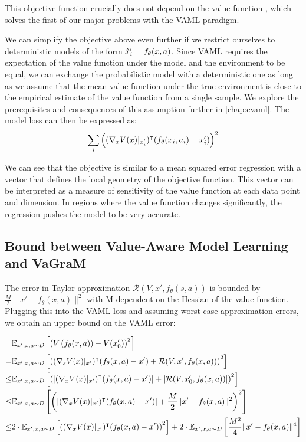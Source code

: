This objective function crucially does not depend on the value function , which solves the first of our major problems with the VAML paradigm.

We can simplify the objective above even further if we restrict ourselves to deterministic models of the form $\hat{x}'_i = f_\theta(x,a)$.
Since VAML requires the expectation of the value function under the model and the environment to be equal, we can exchange the probabilistic model with a deterministic one as long as we assume that the mean value function under the true environment is close to the empirical estimate of the value function from a single sample.
We explore the prerequisites and consequences of this assumption further in \autoref{chap:cvaml}.
The model loss can then be expressed as:
\begin{align}
    \sum_i {\left((\nabla_x V(x)|_{x'_i})^\intercal (f_\theta(x_i,a_i) - x'_i) \right)^2} \label{eq:vagram:taylor_vaml}
\end{align}

We can see that the objective is similar to a mean squared error regression with a vector that defines the local geometry of the objective function. This vector can be interpreted as a measure of sensitivity of the value function at each data point and dimension. In regions where the value function changes significantly, the regression pushes the model to be very accurate. 

\subsection{Bound between Value-Aware Model Learning and VaGraM}
\label{app:taylor_bound}

The error in Taylor approximation $\mathcal{R}(V, x', f_\theta(s,a))$ is bounded by $\frac{M}{2}\|x' - f_\theta(x,a)\|^2$ with M dependent on the Hessian of the value function. Plugging this into the VAML loss and assuming worst case approximation errors, we obtain an upper bound on the VAML error:

\begin{align}
    &\mathbb{E}_{x',x,a \sim D}\left[\left(V\left(f_\theta(x,a) \right) - V(x_0')\right)^2\right] \\
    = &\mathbb{E}_{x',x,a \sim D}\left[\left((\nabla_s V(x)|_{x'})^\intercal (f_\theta(x,a) - x') + \mathcal{R}(V, x',f_\theta(x,a))\right)^2\right]\\
    \leq &\mathbb{E}_{x',x,a \sim D}\left[\left(\left|(\nabla_x V(x)|_{x'})^\intercal (f_\theta(x,a) - x')\right| + \left|\mathcal{R}(V, x_0', f_\theta(x,a))\right|\right)^2\right]\\
    \leq &\mathbb{E}_{x',x,a \sim D}\left[{\left(\left|(\nabla_x V(x)|_{x'})^\intercal (f_\theta(x,a) - x')\right| + \frac{M}{2}\|x' - f_\theta(x,a)\|^2\right)^2}\right]\\
    \leq &2\cdot\mathbb{E}_{x',x,a \sim D}\left[{\left((\nabla_x V(x)|_{x'})^\intercal (f_\theta(x,a) - x')\right)^2}\right] + 2\cdot\mathbb{E}_{x',x,a \sim D}\left[\frac{M^2}{4}\|x' - f_\theta(x,a)\|^4\right]
\end{align}

